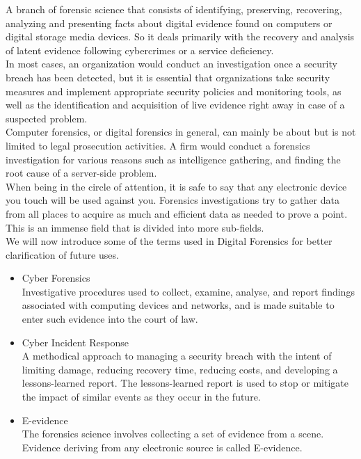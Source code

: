 A branch of forensic science that consists of identifying, preserving, recovering, analyzing and presenting facts about digital evidence found on computers or digital storage media devices. So it deals primarily with the recovery and analysis of latent evidence following cybercrimes or a service deficiency.\\
In most cases, an organization would conduct an investigation once a security breach has been detected, but it is essential that organizations take security measures and implement appropriate security policies and monitoring tools, as well as the identification and acquisition of live evidence right away in case of a suspected problem.\\
Computer forensics, or digital forensics in general, can mainly be about but is not limited to legal prosecution activities. A firm would conduct a forensics investigation for various reasons such as intelligence gathering, and finding the root cause of a server-side problem.\\
When being in the circle of attention, it is safe to say that any electronic device you touch will be used against you. Forensics investigations try to gather data from all places to acquire as much and efficient data as needed to prove a point. This is an immense field that is divided into more sub-fields.\\
We will now introduce some of the terms used in Digital Forensics for better clarification of future uses.
\begin{itemize}
    \item Cyber Forensics\\
    Investigative procedures used to collect, examine, analyse, and report findings associated with computing devices and networks, and is made suitable to enter such evidence into the court of law.
    \item Cyber Incident Response\\
    A methodical approach to managing a security breach with the intent of limiting damage, reducing recovery time, reducing costs, and developing a lessons-learned report. The lessons-learned report is used to stop or mitigate the impact of similar events as they occur in the future.
    \item E-evidence\\
    The forensics science involves collecting a set of evidence from a scene. Evidence deriving from any electronic source is called E-evidence.
\end{itemize}

